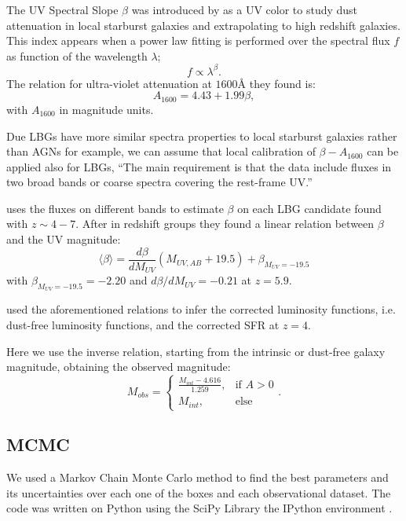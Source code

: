 \documentclass{emulateapj}
\begin{document}
The UV Spectral Slope $\beta$ was introduced by \citet{Meurer99} as a UV color to 
study dust attenuation in local starburst galaxies and extrapolating to high redshift galaxies. 
This index appears when a power law fitting is performed over the spectral flux $f$ 
as function of the wavelength $\lambda$;
\[ f \propto \lambda^\beta.\]
The relation for ultra-violet attenuation at $1600 \textrm{\AA}$ they found is:
\begin{equation}
A_{1600} = 4.43 + 1.99 \beta,
\end{equation}
with $A_{1600}$ in magnitude units. 

Due LBGs have more similar spectra properties to local starburst galaxies rather than AGNs 
for example, we can assume that local calibration of $\beta-A_{1600}$ can be applied also 
for LBGs,
``The main requirement is that the data include fluxes in two broad bands or coarse spectra 
covering the rest-frame UV.''


\citet{Bouwens12} uses the fluxes on different bands to estimate $\beta$ on each LBG 
candidate found with $z \sim 4-7$. After in redshift groups they found a linear relation 
between $\beta$ and the UV magnitude:
\begin{equation}
\langle \beta \rangle = \frac{d \beta}{d M_{UV}} \left( M_{UV,AB}+19.5 \right) 
                                   + \beta_{M_{UV}=-19.5}
\end{equation}
with $ \beta_{M_{UV}=-19.5} = -2.20$ and $d \beta/d M_{UV} = -0.21$ at $z=5.9$.

\citet{Smit12} used the aforementioned relations to infer the corrected luminosity functions,
i.e. dust-free luminosity functions, and the corrected SFR at $z=4$. 

Here we use the inverse relation, starting from the intrinsic or dust-free galaxy magnitude, 
obtaining the observed magnitude:
\begin{equation}
  M_{obs} = \begin{cases} 
                         \frac{M_{int}-4.616}{1.259}, &\mbox{if } A>0 \\
                         M_{int}, &\mbox{else}
                   \end{cases}.
\label{eqn. dust attenuation}
\end{equation}


\subsection{MCMC}
We used a Markov Chain Monte Carlo method to find the best parameters and its 
uncertainties over each one of the boxes and each observational dataset. The 
code was written on Python using the SciPy Library \citep{SciPy}
the IPython environment \citep{IPython}.
\end{document}
